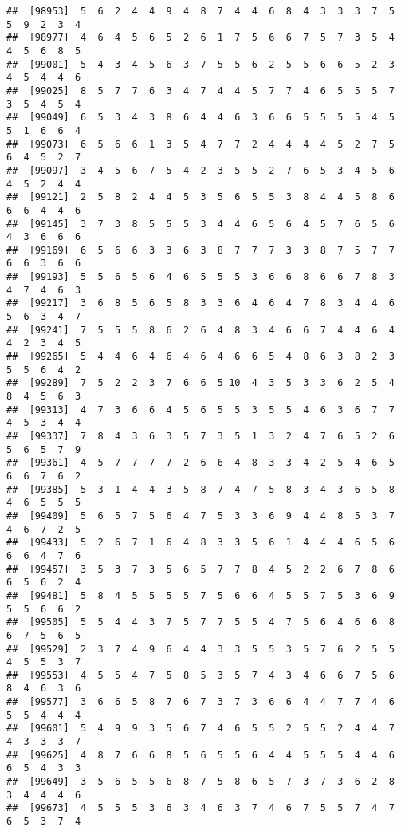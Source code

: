 \documentclass[
]{book}
\begin{document}
\begin{verbatim}
##  [98953]  5  6  2  4  4  9  4  8  7  4  4  6  8  4  3  3  3  7  5  5  9  2  3  4
##  [98977]  4  6  4  5  6  5  2  6  1  7  5  6  6  7  5  7  3  5  4  4  5  6  8  5
##  [99001]  5  4  3  4  5  6  3  7  5  5  6  2  5  5  6  6  5  2  3  4  5  4  4  6
##  [99025]  8  5  7  7  6  3  4  7  4  4  5  7  7  4  6  5  5  5  7  3  5  4  5  4
##  [99049]  6  5  3  4  3  8  6  4  4  6  3  6  6  5  5  5  5  4  5  5  1  6  6  4
##  [99073]  6  5  6  6  1  3  5  4  7  7  2  4  4  4  4  5  2  7  5  6  4  5  2  7
##  [99097]  3  4  5  6  7  5  4  2  3  5  5  2  7  6  5  3  4  5  6  4  5  2  4  4
##  [99121]  2  5  8  2  4  4  5  3  5  6  5  5  3  8  4  4  5  8  6  6  6  4  4  6
##  [99145]  3  7  3  8  5  5  5  3  4  4  6  5  6  4  5  7  6  5  6  4  3  6  6  6
##  [99169]  6  5  6  6  3  3  6  3  8  7  7  7  3  3  8  7  5  7  7  6  6  3  6  6
##  [99193]  5  5  6  5  6  4  6  5  5  5  3  6  6  8  6  6  7  8  3  4  7  4  6  3
##  [99217]  3  6  8  5  6  5  8  3  3  6  4  6  4  7  8  3  4  4  6  5  6  3  4  7
##  [99241]  7  5  5  5  8  6  2  6  4  8  3  4  6  6  7  4  4  6  4  4  2  3  4  5
##  [99265]  5  4  4  6  4  6  4  6  4  6  6  5  4  8  6  3  8  2  3  5  5  6  4  2
##  [99289]  7  5  2  2  3  7  6  6  5 10  4  3  5  3  3  6  2  5  4  8  4  5  6  3
##  [99313]  4  7  3  6  6  4  5  6  5  5  3  5  5  4  6  3  6  7  7  4  5  3  4  4
##  [99337]  7  8  4  3  6  3  5  7  3  5  1  3  2  4  7  6  5  2  6  5  6  5  7  9
##  [99361]  4  5  7  7  7  7  2  6  6  4  8  3  3  4  2  5  4  6  5  6  6  7  6  2
##  [99385]  5  3  1  4  4  3  5  8  7  4  7  5  8  3  4  3  6  5  8  4  6  5  5  5
##  [99409]  5  6  5  7  5  6  4  7  5  3  3  6  9  4  4  8  5  3  7  4  6  7  2  5
##  [99433]  5  2  6  7  1  6  4  8  3  3  5  6  1  4  4  4  6  5  6  6  6  4  7  6
##  [99457]  3  5  3  7  3  5  6  5  7  7  8  4  5  2  2  6  7  8  6  6  5  6  2  4
##  [99481]  5  8  4  5  5  5  5  7  5  6  6  4  5  5  7  5  3  6  9  5  5  6  6  2
##  [99505]  5  5  4  4  3  7  5  7  7  5  5  4  7  5  6  4  6  6  8  6  7  5  6  5
##  [99529]  2  3  7  4  9  6  4  4  3  3  5  5  3  5  7  6  2  5  5  4  5  5  3  7
##  [99553]  4  5  5  4  7  5  8  5  3  5  7  4  3  4  6  6  7  5  6  8  4  6  3  6
##  [99577]  3  6  6  5  8  7  6  7  3  7  3  6  6  4  4  7  7  4  6  5  5  4  4  4
##  [99601]  5  4  9  9  3  5  6  7  4  6  5  5  2  5  5  2  4  4  7  4  3  3  3  7
##  [99625]  4  8  7  6  6  8  5  6  5  5  6  4  4  5  5  5  4  4  6  6  5  4  3  3
##  [99649]  3  5  6  5  5  6  8  7  5  8  6  5  7  3  7  3  6  2  8  3  4  4  4  6
##  [99673]  4  5  5  5  3  6  3  4  6  3  7  4  6  7  5  5  7  4  7  6  5  3  7  4

\end{verbatim}
\end{document}
